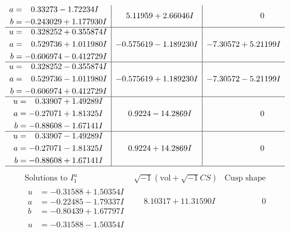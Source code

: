 \documentclass[1p]{elsarticle_modified}
\theoremstyle{definition}
\newcommand{\I}{\sqrt{-1}}
\begin{document}
$$\begin{array}{c|c|c}
\begin{aligned}
a &= \phantom{-}0.33273 - 1.72234 I \\
b &= -0.243029 + 1.177930 I\end{aligned}
 & \phantom{-}5.11959 + 2.66046 I & \phantom{-0.000000 } 0 \\ \hline\begin{aligned}
u &= \phantom{-}0.328252 + 0.355874 I \\
a &= \phantom{-}0.529736 + 1.011980 I \\
b &= -0.606974 - 0.412729 I\end{aligned}
 & -0.575619 - 1.189230 I & -7.30572 + 5.21199 I \\ \hline\begin{aligned}
u &= \phantom{-}0.328252 - 0.355874 I \\
a &= \phantom{-}0.529736 - 1.011980 I \\
b &= -0.606974 + 0.412729 I\end{aligned}
 & -0.575619 + 1.189230 I & -7.30572 - 5.21199 I \\ \hline\begin{aligned}
u &= \phantom{-}0.33907 + 1.49289 I \\
a &= -0.27071 + 1.81325 I \\
b &= -0.88608 - 1.67141 I\end{aligned}
 & \phantom{-}0.9224 - 14.2869 I & \phantom{-0.000000 } 0 \\ \hline\begin{aligned}
u &= \phantom{-}0.33907 - 1.49289 I \\
a &= -0.27071 - 1.81325 I \\
b &= -0.88608 + 1.67141 I\end{aligned}
 & \phantom{-}0.9224 + 14.2869 I & \phantom{-0.000000 } 0\\
 \hline 
 \end{array}$$\newpage$$\begin{array}{c|c|c}  
\text{Solutions to }I^u_{1}& \I (\text{vol} + \sqrt{-1}CS) & \text{Cusp shape}\\
 \hline 
\begin{aligned}
u &= -0.31588 + 1.50354 I \\
a &= -0.22485 - 1.79337 I \\
b &= -0.80439 + 1.67797 I\end{aligned}
 & \phantom{-}8.10317 + 11.31590 I & \phantom{-0.000000 } 0 \\ \hline\begin{aligned}
u &= -0.31588 - 1.50354 I \\

\end{aligned}
\end{array}$$
\end{document}
